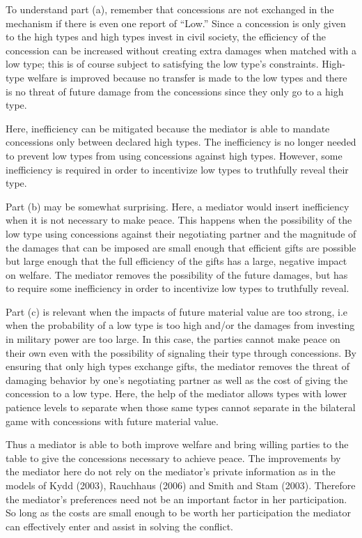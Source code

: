 \documentclass[12pt, letterpaper]{article}
\begin{document}
To understand part (a), remember that concessions are not exchanged in the mechanism if there is even one report of ``Low.'' Since a concession is only given to the high types and high types invest in civil society, the efficiency of the concession can be increased without creating extra damages when matched with a low type; this is of course subject to satisfying the low type's constraints. High-type welfare is improved because no transfer is made to the low types and there is no threat of future damage from the concessions since they only go to a high type.

Here, inefficiency can be mitigated because the mediator is able to mandate concessions only between declared high types. The inefficiency is no longer needed to prevent low types from using concessions against high types. However, some inefficiency is required in order to incentivize low types to truthfully reveal their type.

Part (b) may be somewhat surprising. Here, a mediator would insert inefficiency when it is not necessary to make peace. This happens when the possibility of the low type using concessions against their negotiating partner and the magnitude of the damages that can be imposed are small enough that efficient gifts are possible but large enough that the full efficiency of the gifts has a large, negative impact on welfare. The mediator removes the possibility of the future damages, but has to require some inefficiency in order to incentivize low types to truthfully reveal.

Part (c) is relevant when the impacts of future material value are too strong, i.e when the probability of a low type is too high and/or the damages from investing in military power are too large. In this case, the parties cannot make peace on their own even with the possibility of signaling their type through concessions. By ensuring that only high types exchange gifts, the mediator removes the threat of damaging behavior by one's negotiating partner as well as the cost of giving the concession to a low type. Here, the help of the mediator allows types with lower patience levels to separate when those same types cannot separate in the bilateral game with concessions with future material value.

Thus a mediator is able to both improve welfare and bring willing parties to the table to give the concessions necessary to achieve peace. The improvements by the mediator here do not rely on the mediator's private information as in the models of Kydd (2003), Rauchhaus (2006) and Smith and Stam (2003). Therefore the mediator's preferences need not be an important factor in her participation. So long as the costs are small enough to be worth her participation the mediator can effectively enter and assist in solving the conflict.
\end{document}
